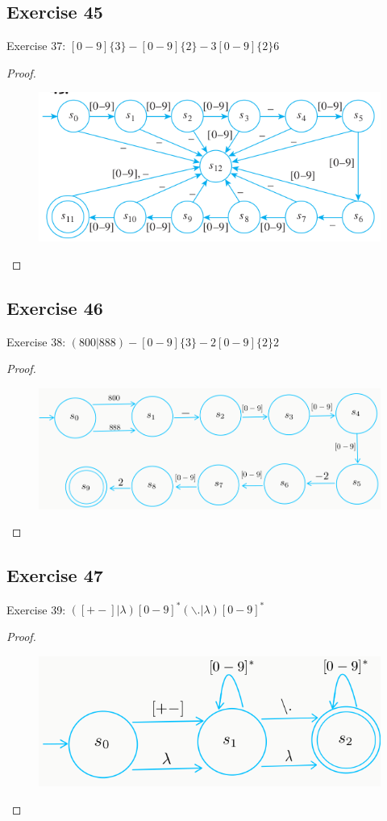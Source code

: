 \documentclass[14pt]{extarticle}
\begin{document}
\subsection{Exercise 45}
Exercise 37: \([0 - 9]\{3\} - [0 - 9]\{2\} - 3[0 - 9]\{2\}6\)
\begin{proof}
    \begin{figure}[ht!]
        \centering
        \includegraphics[scale=0.5]{../images/12.2.45.png}
    \end{figure}
\end{proof}

\subsection{Exercise 46}
Exercise 38: \((800|888)-[0-9]\{3\}-2[0-9]\{2\}2\)
\begin{proof}
    \begin{figure}[ht!]
        \centering
        \includegraphics[scale=0.4]{../images/12.2.46.png}
    \end{figure}
\end{proof}

\subsection{Exercise 47}
Exercise 39: \(([+ -] | \lambda)[0 - 9]^* (\backslash. | \lambda)[0 - 9]^*\)
\begin{proof}
    \begin{figure}[ht!]
        \centering
        \includegraphics[scale=0.4]{../images/12.2.47.png}
    \end{figure}
\end{proof}
\end{document}
